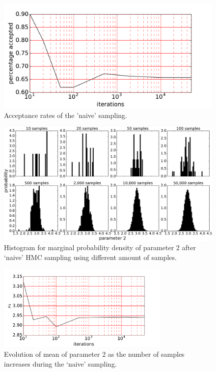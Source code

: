 \begin{figure}
	\centering
	\includegraphics[width=\textwidth]{simple-linear-system/figures/2d_naive/accepted.pdf}
	\caption{Acceptance rates of the 'naive' sampling.}
	\label{fig:linear_system.accepted}
\end{figure}

\begin{figure}
	\centering
	\includegraphics[width=\textwidth]{simple-linear-system/figures/2d_naive/histogram_p2.pdf}
	\caption{Histogram for marginal probability density of parameter 2 after `naive' HMC sampling using different amount of
	samples.}
	\label{fig:linear_system.histq2}
\end{figure}

\begin{figure}
	\centering
	\includegraphics[width=0.75\textwidth]{simple-linear-system/figures/2d_naive/means2.pdf}
	\caption{Evolution of mean of parameter 2 as the number of samples increases during the `naive' sampling.}
	\label{fig:linear_system.evolution_q2}
\end{figure}

